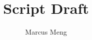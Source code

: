 \documentclass{screenplay}[2006/11/15]
\title{Script Draft}
\author{Marcus Meng}
\begin{document}
\coverpage

\fadein







\fadeout

\theend
\end{document}
